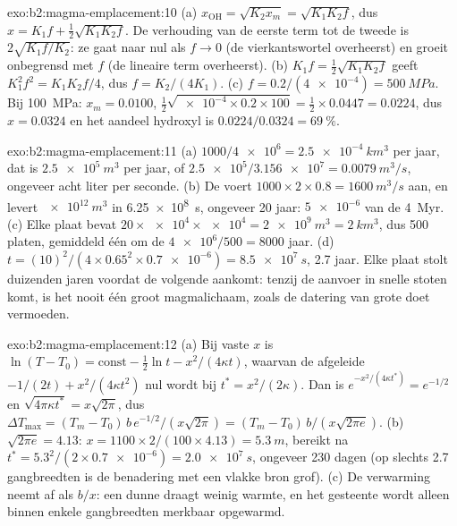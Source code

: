 \begin{solution}{exo:b2:magma-emplacement:10}
(a) $x_{\mathrm{OH}} = \sqrt{K_2x_m} = \sqrt{K_1K_2f}$, dus $x = K_1f + \frac12\sqrt{K_1K_2f}$.
De verhouding van de eerste term tot de tweede is $2\sqrt{K_1f/K_2}$: ze gaat naar nul
als $f \to 0$ (de vierkantswortel overheerst) en groeit onbegrensd met $f$ (de
lineaire term overheerst). (b) $K_1 f = \frac12\sqrt{K_1K_2 f}$ geeft $K_1^2f^2 =
K_1K_2f/4$, dus $f = K_2/(4K_1)$. (c) $f = 0.2/(\num{4e-4}) = \qty{500}{MPa}$. Bij
\qty{100}{MPa}: $x_m = 0.0100$, $\frac12\sqrt{\num{e-4}\times0.2\times100} =
\frac12\times0.0447 = 0.0224$, dus $x = 0.0324$ en het aandeel hydroxyl is
$0.0224/0.0324 = \qty{69}{\percent}$.
\end{solution}

\begin{solution}{exo:b2:magma-emplacement:11}
(a) $1000/\num{4e6} = \qty{2.5e-4}{km^3}$ per jaar, dat is $\qty{2.5e5}{m^3}$ per jaar,
of $\num{2.5e5}/\num{3.156e7} = \qty{0.0079}{m^3/s}$, ongeveer acht liter per seconde.
(b) De  voert $1000\times2\times0.8 = \qty{1600}{m^3/s}$ aan, en levert
$\qty{e12}{m^3}$ in \qty{6.25e8}{s}, ongeveer 20 jaar: $\num{5e-6}$ van de
\qty{4}{Myr}. (c) Elke plaat bevat $20\times\num{e4}\times\num{e4} = \qty{2e9}{m^3} =
\qty{2}{km^3}$, dus 500 platen, gemiddeld één om de $\num{4e6}/500 = 8000$ jaar.
(d) $t = (10)^2/(4\times0.65^2\times\num{0.7e-6}) = \qty{8.5e7}{s}$, 2.7 jaar. Elke
plaat stolt duizenden jaren voordat de volgende aankomt: tenzij de aanvoer
in snelle stoten komt, is het  nooit één groot magmalichaam, zoals de
datering van grote  doet vermoeden.
\end{solution}

\begin{solution}{exo:b2:magma-emplacement:12}
(a) Bij vaste $x$ is $\ln(T - T_0) = \text{const} - \frac12\ln t - x^2/(4\kappa t)$, waarvan
de afgeleide $-1/(2t) + x^2/(4\kappa t^2)$ nul wordt bij $t^* = x^2/(2\kappa)$. Dan is
$e^{-x^2/(4\kappa t^*)} = e^{-1/2}$ en $\sqrt{4\pi\kappa t^*} = x\sqrt{2\pi}$, dus $\Delta
T_{\max} = (T_m - T_0)\,b\,e^{-1/2}/(x\sqrt{2\pi}) = (T_m - T_0)\,b/(x\sqrt{2\pi e})$. (b)
$\sqrt{2\pi e} = 4.13$: $x = 1100\times2/(100\times4.13) = \qty{5.3}{m}$, bereikt na
$t^* = 5.3^2/(2\times\num{0.7e-6}) = \qty{2.0e7}{s}$, ongeveer 230 dagen (op slechts 2.7
gangbreedten is de benadering met een vlakke bron grof). (c) De verwarming neemt af
als $b/x$: een dunne  draagt weinig warmte, en het gesteente wordt alleen
binnen enkele gangbreedten merkbaar opgewarmd.
\end{solution}


